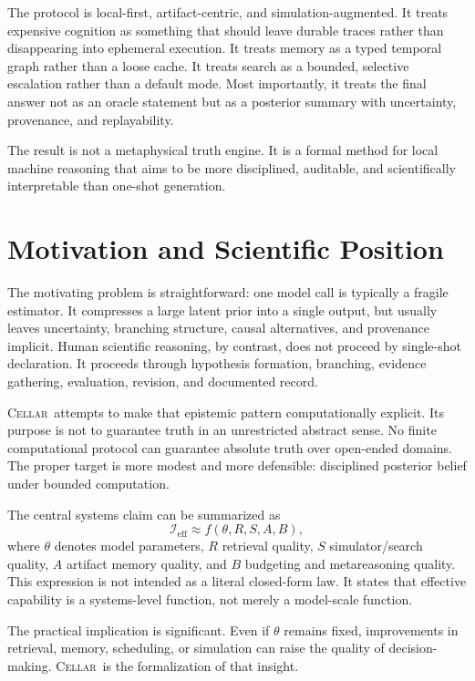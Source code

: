 \documentclass[11pt]{article}
\theoremstyle{definition}
\newcommand{\Ieff}{\mathcal{I}_{\mathrm{eff}}}
\newcommand{\cellar}{\textsc{Cellar}}
\begin{document}
The protocol is local-first, artifact-centric, and simulation-augmented. It treats expensive cognition as something that should leave durable traces rather than disappearing into ephemeral execution. It treats memory as a typed temporal graph rather than a loose cache. It treats search as a bounded, selective escalation rather than a default mode. Most importantly, it treats the final answer not as an oracle statement but as a posterior summary with uncertainty, provenance, and replayability.

The result is not a metaphysical truth engine. It is a formal method for local machine reasoning that aims to be more disciplined, auditable, and scientifically interpretable than one-shot generation.

\section{Motivation and Scientific Position}

The motivating problem is straightforward: one model call is typically a fragile estimator. It compresses a large latent prior into a single output, but usually leaves uncertainty, branching structure, causal alternatives, and provenance implicit. Human scientific reasoning, by contrast, does not proceed by single-shot declaration. It proceeds through hypothesis formation, branching, evidence gathering, evaluation, revision, and documented record.

\cellar\ attempts to make that epistemic pattern computationally explicit. Its purpose is not to guarantee truth in an unrestricted abstract sense. No finite computational protocol can guarantee absolute truth over open-ended domains. The proper target is more modest and more defensible: disciplined posterior belief under bounded computation.

The central systems claim can be summarized as
\[
\Ieff \approx f(\theta, R, S, A, B),
\]
where \(\theta\) denotes model parameters, \(R\) retrieval quality, \(S\) simulator/search quality, \(A\) artifact memory quality, and \(B\) budgeting and metareasoning quality. This expression is not intended as a literal closed-form law. It states that effective capability is a systems-level function, not merely a model-scale function.

The practical implication is significant. Even if \(\theta\) remains fixed, improvements in retrieval, memory, scheduling, or simulation can raise the quality of decision-making. \cellar\ is the formalization of that insight.
\end{document}
